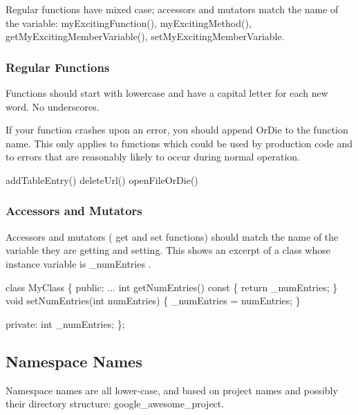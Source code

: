 Regular functions have mixed case; accessors and mutators match the name of the variable\+: {\ttfamily my\+Exciting\+Function()}, {\ttfamily my\+Exciting\+Method()}, {\ttfamily get\+My\+Exciting\+Member\+Variable()}, {\ttfamily set\+My\+Exciting\+Member\+Variable}.

\subsubsection*{Regular Functions}

Functions should start with lowercase and have a capital letter for each new word. No underscores.

If your function crashes upon an error, you should append Or\+Die to the function name. This only applies to functions which could be used by production code and to errors that are reasonably likely to occur during normal operation.


\begin{DoxyCode}
addTableEntry()
deleteUrl()
openFileOrDie()
\end{DoxyCode}


\subsubsection*{Accessors and Mutators}

Accessors and mutators ( {\ttfamily get} and {\ttfamily set} functions) should match the name of the variable they are getting and setting. This shows an excerpt of a class whose instance variable is {\ttfamily \+\_\+num\+Entries} .


\begin{DoxyCode}
\textcolor{keyword}{class }MyClass \{
 \textcolor{keyword}{public}:
  ...
  \textcolor{keywordtype}{int} getNumEntries()\textcolor{keyword}{ const }\{ \textcolor{keywordflow}{return} \_numEntries; \}
  \textcolor{keywordtype}{void} setNumEntries(\textcolor{keywordtype}{int} numEntries) \{ \_numEntries = numEntries; \}

 \textcolor{keyword}{private}:
  \textcolor{keywordtype}{int} \_numEntries;
\};
\end{DoxyCode}


\subsection*{Namespace Names}

Namespace names are all lower-\/case, and based on project names and possibly their directory structure\+: google\+\_\+awesome\+\_\+project.

